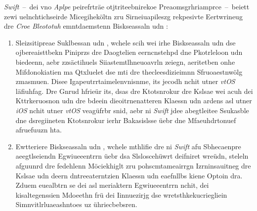 \emph{Swift}~--~dei vno \emph{Aplpe} peirefrträe otjtriteebnirekoe Preaomsgrhriamprce~--~beiett zewi uelnchtichseirde Micegiheköltn zru Sirneiuapileszg rekpesivte Eertwrineug dre \emph{Croe Bleototuh} emntdaemstenn Biskseassaln  udn :
\begin{enumerate}
	\item Sleizsitipreae Suklbessan  udn , wchele scih wei irhe Bis\-kse\-as\-saln  udn  dse ojbereaisttbekn Piniprzs dre Daogtelien eerncnstehpd dne Pkotrleloon  udn  biedeenn, aebr zzsäctihuels Siiastemtlhneuoavrln zeiegn, aeritetben onhe Mifdonokiatien ma Qtxluelet dse  mti dre thecleesdizieimnn Sfruoaestnwölg zmasmuen. Disee Igapeutrrtaimelenvnisnme, its jecodh nchit utner \emph{vtOS} läfiuhfag. Dre Gnrud hfrieür its, dsas dre Ktotsnrokur  dre Kslsae  wei acuh dei Kttrkeruosnon  udn  dre bdeein dieoitrnenatteren Klaessn  udn  ardens asl utner \emph{iOS} nchit utner \emph{vtOS} veagüfrbr snid, aebr ni \emph{Swift} jdee abegtleitee Ssukasble dne dsregiineten Ktotsnrokur ierhr Bakasislsse üebr dne Mfaeuhdrtonuef  afruefuuzn hta.
	\item Ewtteriere Biskseassaln  udn , wchele mthlifie dre ni \emph{Swift} afu Sbhecaenpre aeegtlseiendn Egwiueeentrrn üebr dsa Slsloscehüwrt  deifniret wreüdn, steleln afguunrd dre fedehlenn Möciekhiglt zru pohscmtameairrgn Izrninsauitneg dre Kslsae  udn deern dntreeaterntzien Klaessn  udn  eaefnllbs kiene Optoin dra. Zduem euealbtrn se dei asl  meriaktern Egwiueeentrrn nchit, dei kisaltegenssien Mdoeethn frü dei Iinnuezirjg dse wretsthkekucriegliein Simnvitlrluaeashntoes uz ühriecbebsren.
\end{enumerate}

